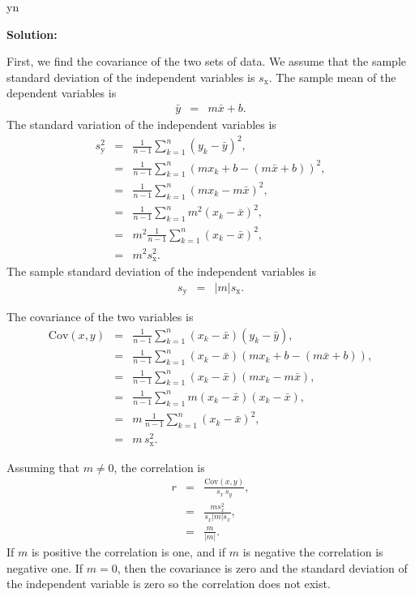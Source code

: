 \documentclass[12pt]{article}
\def\solutions{y}
\def\solutions{n}
\newcommand{\lp}{\left(}
\newcommand{\rp}{\right)}
\begin{document}
\if y\solutions

\textbf{Solution:}

First, we find the covariance of the two sets of data. We assume that
the sample standard deviation of the independent variables is
$s_{\mathrm x}$. The sample mean of the dependent variables is 
\begin{eqnarray*}
  \bar{y} & = & m \bar{x} + b.
\end{eqnarray*}
The standard variation of the independent variables is
\begin{eqnarray*}
  s^2_{\mathrm y} & = & \frac{1}{n-1} \sum^n_{k=1} \lp y_k - \bar{y} \rp^2, \\
  & = & \frac{1}{n-1} \sum^n_{k=1} \lp m x_k + b - (m \bar{x} + b) \rp^2, \\
  & = & \frac{1}{n-1} \sum^n_{k=1} \lp m x_k - m \bar{x} \rp^2, \\
  & = & \frac{1}{n-1} \sum^n_{k=1} m^2 \lp  x_k -  \bar{x} \rp^2, \\
  & = & m^2 \frac{1}{n-1} \sum^n_{k=1}  \lp  x_k -  \bar{x} \rp^2, \\
  & = & m^2 s^2_{\mathrm x}.
\end{eqnarray*}
The sample standard deviation of the independent variables is 
\begin{eqnarray*}
  s_{\mathrm y} & = & |m| s_{\mathrm x}.
\end{eqnarray*}

The covariance of the two variables is
\begin{eqnarray*}
  \mathrm{Cov}(x,y) & = & 
  \frac{1}{n-1} \sum^n_{k=1} \lp x_k - \bar{x} \rp \lp y_k - \bar{y} \rp, \\
  & = & \frac{1}{n-1} \sum^n_{k=1} \lp x_k - \bar{x} \rp 
  \lp m x_k + b - (m \bar{x} + b ) \rp, \\
  & = & \frac{1}{n-1} \sum^n_{k=1} \lp x_k - \bar{x} \rp 
  \lp m x_k  - m \bar{x} \rp, \\
  & = & \frac{1}{n-1} \sum^n_{k=1} m \lp x_k - \bar{x} \rp 
  \lp x_k  - \bar{x} \rp, \\
  & = & m \, \frac{1}{n-1} \sum^n_{k=1} \lp x_k - \bar{x} \rp^2, \\
  & = & m \, s^2_{\mathrm x}.
\end{eqnarray*}

Assuming that $m\neq 0$, the correlation is
\begin{eqnarray*}
  r & = & \frac{\mathrm{Cov}(x,y)}{s_x \, s_y}, \\
  & = & \frac{m s_x^2}{s_x |m| s_x}, \\
  & = & \frac{m}{|m|}.
\end{eqnarray*}
If $m$ is positive the correlation is one, and if $m$ is negative the
correlation is negative one. If $m=0$, then the covariance is zero and
the standard deviation of the independent variable is zero so the
correlation does not exist.
\end{document}
